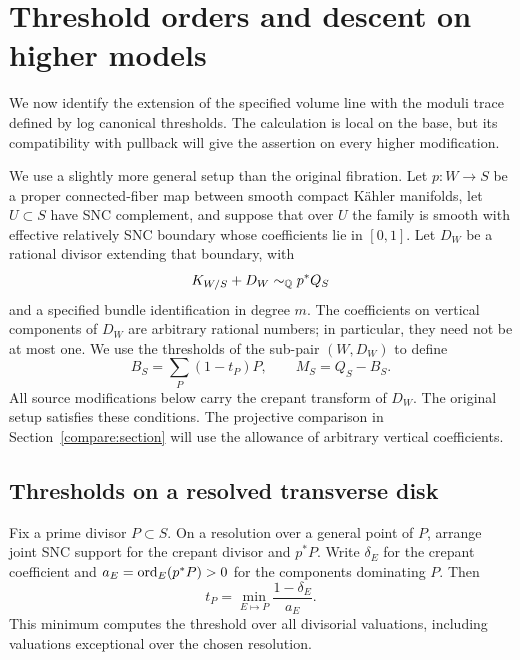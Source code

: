 \section{Threshold orders and descent on higher models}
\label{orders:section}

We now identify the extension of the specified volume line with the
moduli trace defined by log canonical thresholds.  The calculation is
local on the base, but its compatibility with pullback will give the
assertion on every higher modification.

We use a slightly more general setup than the original fibration.
Let \(p:W\to S\) be a proper connected-fiber map between smooth compact
K\"ahler manifolds, let \(U\subset S\) have SNC complement, and suppose
that over \(U\) the family is smooth with effective relatively SNC
boundary whose coefficients lie in \([0,1]\).  Let \(D_W\) be a
rational divisor extending that boundary, with
\begin{equation}
 K_{W/S}+D_W\sim_{\mathbb Q}p^*Q_S
 \label{orders:adjoint}
\end{equation}
and a specified bundle identification in degree \(m\).
The coefficients on vertical components of \(D_W\) are arbitrary
rational numbers; in particular, they need not be at most one.
We use the thresholds of the sub-pair \((W,D_W)\) to define
\[
 B_S=\sum_P(1-t_P)P,\qquad M_S=Q_S-B_S.
\]
All source modifications below carry the crepant transform of
\(D_W\).  The original setup satisfies these conditions.  The
projective comparison in Section~\ref{compare:section} will use the
allowance of arbitrary vertical coefficients.

\subsection{Thresholds on a resolved transverse disk}
\label{orders:thresholds}

\begin{lemma}
\label{orders:threshold}
Fix a prime divisor \(P\subset S\).  On a resolution over a general
point of \(P\), arrange joint SNC support for the crepant divisor
and \(p^*P\).  Write \(\delta_E\) for the crepant coefficient and
\(a_E=\operatorname{ord}_E(p^*P)>0\) for the components dominating \(P\).  Then
\begin{equation}
                 t_P=\min_{E\mapsto P}\frac{1-\delta_E}{a_E}.
 \label{orders:thresholdformula}
\end{equation}
This minimum computes the threshold over all divisorial valuations,
including valuations exceptional over the chosen resolution.
\end{lemma}

